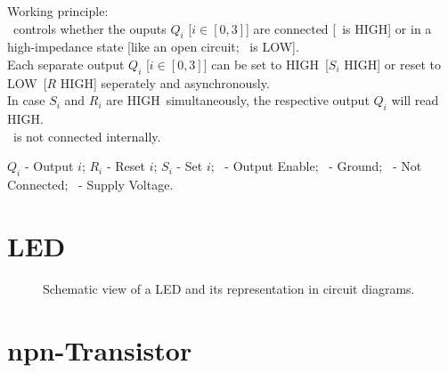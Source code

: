 \documentclass[english, parskip=half-, 11pt]{scrartcl}
\newcommand{\ground}{\text{GND}}
\newcommand{\vcc}{\text{VCC}}
\newcommand{\outputEnable}{\text{OE}}
\newcommand{\notConnected}{\text{NC}}
\newcommand{\signalHigh}{HIGH}
\newcommand{\signalLow}{LOW}
\newcommand{\latchReset}{R}
\newcommand{\latchSet}{S}
\newcommand{\latchOutput}{Q}
\newcommand{\latchOutputEnable}{\outputEnable}
\newcommand{\latchNotConnected}{\notConnected}
\begin{document}
Working principle:\\
\latchOutputEnable\ controls whether the ouputs $\latchOutput_i$ [$i \in [0,3]$] are connected [\latchOutputEnable\ is \signalHigh] or in a high-impedance state [like an open circuit; \latchOutputEnable\ is \signalLow].\\
Each separate output $\latchOutput_i$ [$i \in [0,3]$] can be set to \signalHigh\ [$\latchSet_i$ \signalHigh] or reset to \signalLow\ [$\latchReset$ \signalHigh] seperately and asynchronously.\\
In case $\latchSet_i$ and $\latchReset_i$ are \signalHigh\ simultaneously, the respective output $\latchOutput_i$ will read \signalHigh.\\
\latchNotConnected\ is not connected internally.

$\latchOutput_i$ - Output $i$; $\latchReset_i$ - Reset $i$; $\latchSet_i$ - Set $i$; \latchOutputEnable\ - Output Enable; \ground\ - Ground; \latchNotConnected\ - Not Connected; \vcc\ - Supply Voltage.


\section{LED}

\begin{figure}[h!]
    \centering
    \caption{Schematic view of a LED and its representation in circuit diagrams.}
    \label{fig:led}
\end{figure}

\section{npn-Transistor}
\end{document}

